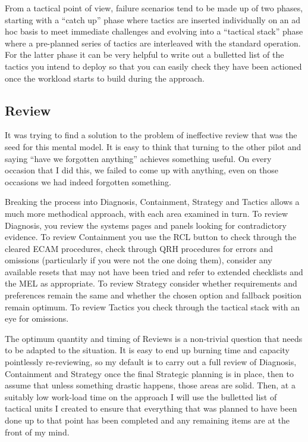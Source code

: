 \documentclass[a5paper,11pt,titlepage]{article}
\begin{document}
From a tactical point of view, failure scenarios tend to be made up of
two phases, starting with a ``catch up'' phase where tactics are
inserted individually on an ad hoc basis to meet immediate challenges
and evolving into a ``tactical stack'' phase where a pre-planned series
of tactics are interleaved with the standard operation. For the latter
phase it can be very helpful to write out a bulletted list of the
tactics you intend to deploy so that you can easily check they have been
actioned once the workload starts to build during the approach.

\subsection{Review}

It was trying to find a solution to the problem of ineffective review
that was the seed for this mental model. It is easy to think that
turning to the other pilot and saying ``have we forgotten anything''
achieves something useful. On every occasion that I did this, we failed
to come up with anything, even on those occasions we had indeed
forgotten something.

Breaking the process into Diagnosis, Containment, Strategy and Tactics
allows a much more methodical approach, with each area examined in turn.
To review Diagnosis, you review the systems pages and panels looking for
contradictory evidence. To review Containment you use the RCL button to
check through the cleared ECAM procedures, check through QRH procedures
for errors and omissions (particularly if you were not the one doing
them), consider any available resets that may not have been tried and
refer to extended checklists and the MEL as appropriate. To review
Strategy consider whether requirements and preferences remain the same
and whether the chosen option and fallback position remain optimum. To
review Tactics you check through the tactical stack with an eye for
omissions.

The optimum quantity and timing of Reviews is a non-trivial question
that needs to be adapted to the situation. It is easy to end up burning
time and capacity pointlessly re-reviewing, so my default is to carry
out a full review of Diagnosis, Containment and Strategy once the final
Strategic planning is in place, then to assume that unless something
drastic happens, those areas are solid. Then, at a suitably low
work-load time on the approach I will use the bulletted list of tactical
units I created to ensure that everything that was planned to have been
done up to that point has been completed and any remaining items are at
the front of my mind.
\end{document}
